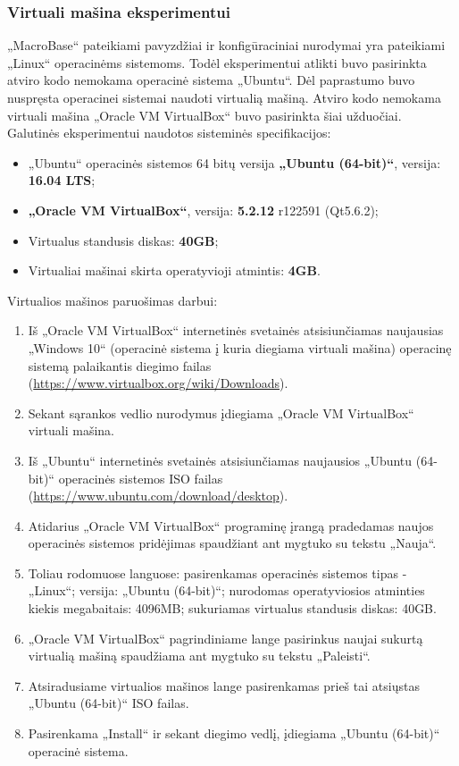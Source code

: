 \documentclass{VUMIFPSkursinis}
\begin{document}
\subsubsection{Virtuali mašina eksperimentui} \label{subsubsec:virtual}
„MacroBase“ pateikiami pavyzdžiai ir konfigūraciniai nurodymai yra pateikiami „Linux“ operacinėms sistemoms. Todėl eksperimentui atlikti buvo pasirinkta atviro kodo nemokama operacinė sistema „Ubuntu“. Dėl paprastumo buvo nuspręsta operacinei sistemai naudoti virtualią mašiną. Atviro kodo nemokama virtuali mašina „Oracle VM VirtualBox“ buvo pasirinkta šiai užduočiai. Galutinės eksperimentui naudotos sisteminės specifikacijos:
\begin{itemize}
\item „Ubuntu“ operacinės sistemos 64 bitų versija \textbf{„Ubuntu (64-bit)“}, versija: \textbf{16.04 LTS};
\item \textbf{„Oracle VM VirtualBox“}, versija: \textbf{5.2.12} r122591 (Qt5.6.2);
\item Virtualus standusis diskas: \textbf{40GB};
\item Virtualiai mašinai skirta operatyvioji atmintis: \textbf{4GB}.

\end{itemize}

Virtualios mašinos paruošimas darbui:
\begin{enumerate}
\item  Iš „Oracle VM VirtualBox“ internetinės svetainės atsisiunčiamas naujausias „Windows 10“ (operacinė sistema į kuria diegiama virtuali mašina) operacinę sistemą palaikantis diegimo failas (\url{https://www.virtualbox.org/wiki/Downloads}).
\item Sekant sąrankos vedlio nurodymus įdiegiama „Oracle VM VirtualBox“ virtuali mašina.
\item Iš „Ubuntu“ internetinės svetainės atsisiunčiamas naujausios „Ubuntu (64-bit)“ operacinės sistemos ISO failas (\url{https://www.ubuntu.com/download/desktop}).
\item Atidarius „Oracle VM VirtualBox“ programinę įrangą pradedamas naujos operacinės sistemos pridėjimas spaudžiant ant mygtuko su tekstu „Nauja“.
\item Toliau rodomuose languose: pasirenkamas operacinės sistemos tipas - „Linux“; versija: „Ubuntu (64-bit)“; nurodomas operatyviosios atminties kiekis megabaitais: 4096MB; sukuriamas virtualus standusis diskas: 40GB.
\item „Oracle VM VirtualBox“ pagrindiniame lange pasirinkus naujai sukurtą virtualią mašiną spaudžiama ant mygtuko su tekstu „Paleisti“.
\item Atsiradusiame virtualios mašinos lange pasirenkamas prieš tai atsiųstas „Ubuntu (64-bit)“ ISO failas.
\item Pasirenkama „Install“ ir sekant diegimo vedlį, įdiegiama „Ubuntu (64-bit)“ operacinė sistema.
\end{enumerate}
\end{document}
